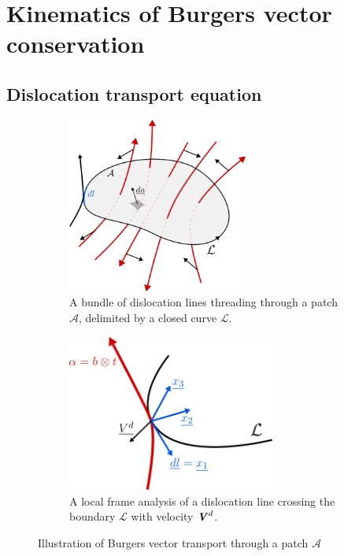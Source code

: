 \documentclass{article}
\begin{document}
\newpage 
\section{Kinematics of Burgers vector conservation}
\subsection{Dislocation transport equation}

\begin{figure}[H]
    \centering
    \begin{subfigure}{.45\textwidth}
      \centering
      \includegraphics[width=0.65\textwidth]{imgs/fdm/flux.png}
      \caption{A bundle of dislocation lines threading through a patch $\mathcal{A}$, delimited by a closed curve $\mathcal{L}$.}
      \label{fig:flux}
    \end{subfigure}%
    \hspace*{1cm}
    \begin{subfigure}{.45\textwidth}
      \centering
      \includegraphics[width=0.75\textwidth]{imgs/fdm/localfram.png}
      \caption{A local frame analysis of a dislocation line  crossing the boundary $\mathcal{L}$ with velocity $\bm{\mathit{V}}^d$.}
    \label{fig:localframe}

    \end{subfigure}
    \caption{Illustration of Burgers vector transport through a patch $\mathcal{A}$}
    \end{figure}
\end{document}
